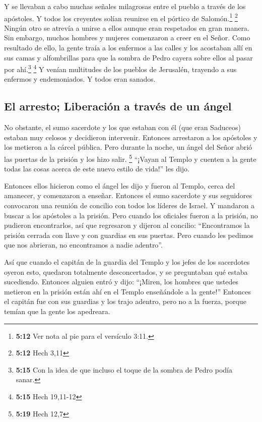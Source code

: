  Y se llevaban a cabo muchas señales milagrosas entre el
pueblo a través de los apóstoles. Y todos los creyentes solían reunirse
en el pórtico de Salomón.\footnote{\textbf{5:12} Ver nota al pie para el
  versículo 3:11.} \footnote{\textbf{5:12} Hech 3,11} 
Ningún otro se atrevía a unirse a ellos aunque eran respetados en gran
manera.  Sin embargo, muchos hombres y mujeres comenzaron
a creer en el Señor.  Como resultado de ello, la gente
traía a los enfermos a las calles y los acostaban allí en sus camas y
alfombrillas para que la sombra de Pedro cayera sobre ellos al pasar por
ahí.\footnote{\textbf{5:15} Con la idea de que incluso el toque de la
  sombra de Pedro podía sanar.} \footnote{\textbf{5:15} Hech 19,11-12}
 Y venían multitudes de los pueblos de Jerusalén,
trayendo a sus enfermos y endemoniados. Y todos eran sanados.

\hypertarget{el-arresto-liberaciuxf3n-a-travuxe9s-de-un-uxe1ngel}{%
\subsection{El arresto; Liberación a través de un
ángel}\label{el-arresto-liberaciuxf3n-a-travuxe9s-de-un-uxe1ngel}}

 No obstante, el sumo sacerdote y los que estaban con él
(que eran Saduceos) estaban muy celosos y decidieron intervenir.
 Entonces arrestaron a los apóstoles y los metieron a la
cárcel pública.  Pero durante la noche, un ángel del
Señor abrió las puertas de la prisión y los hizo salir. \footnote{\textbf{5:19}
  Hech 12,7}  ``¡Vayan al Templo y cuenten a la gente
todas las cosas acerca de este nuevo estilo de vida!'' les dijo.

 Entonces ellos hicieron como el ángel les dijo y fueron
al Templo, cerca del amanecer, y comenzaron a enseñar. Entonces el sumo
sacerdote y sus seguidores convocaron una reunión de concilio con todos
los líderes de Israel. Y mandaron a buscar a los apóstoles a la prisión.
 Pero cuando los oficiales fueron a la prisión, no
pudieron encontrarlos, así que regresaron y dijeron al concilio:
 ``Encontramos la prisión cerrada con llave y con
guardias en sus puertas. Pero cuando les pedimos que nos abrieran, no
encontramos a nadie adentro''.

 Así que cuando el capitán de la guardia del Templo y los
jefes de los sacerdotes oyeron esto, quedaron totalmente desconcertados,
y se preguntaban qué estaba sucediendo.  Entonces alguien
entró y dijo: ``¡Miren, los hombres que ustedes metieron en la prisión
están ahí en el Templo enseñándole a la gente!'' 
Entonces el capitán fue con sus guardias y los trajo adentro, pero no a
la fuerza, porque temían que la gente los apedreara.

